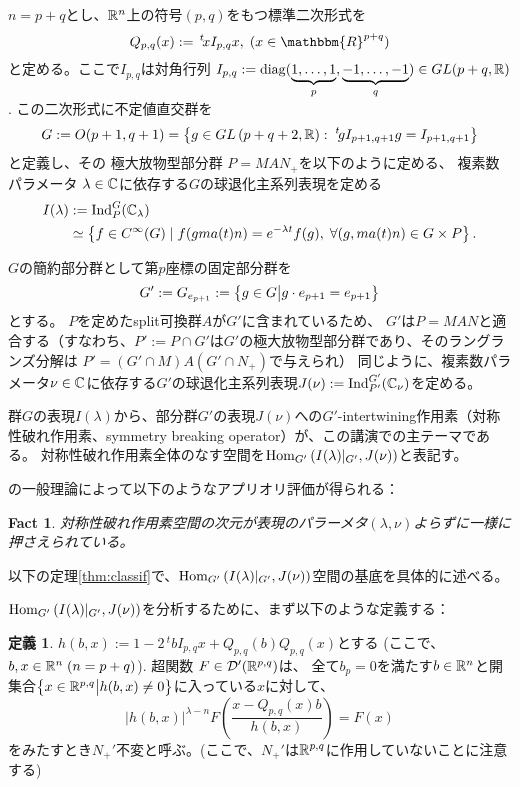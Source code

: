 \documentclass[12pt]{article} %
\newcommand{\assign}{:=}
\newcommand{\tmop}[1]{\ensuremath{\operatorname{#1}}}
\newcommand{\Hom}{\mbox{\normalfont Hom}}
\newcommand{\Ind}{\mbox{\normalfont Ind}}
\newtheorem{fact}{Fact}
\theoremstyle{definition}
\newtheorem{definition}{定義}
\theoremstyle{exampstyle} \newtheorem{examp}[theorem]{Theorem}
\renewcommand{\Q}{Q_{p,q}}
\newcommand{\IlambdaGprime}{I(\lambda)\kern-0.3em\mid_{G'}}
\newcommand{\SBO}{\Hom_{G'}\left(\IlambdaGprime,J(\nu) \right)}
\newcommand{\doubt}[1]{\uwave{#1}}
\begin{document}
  \begin{versiona}
	  $n=p+q$と{し}、$\mathbb{R}^n$上の符号$(p,q)$をもつ標準二次形式を
	  \begin{equation*}
  \Q (x) \assign \,^t \! x I_{p, q} x, \; (x \in
  \mathbbm{R}^{p + q})
	  \end{equation*}
	  と定める。ここで$I_{p,q}$は対角行列
   $I_{p, q} \assign \tmop{diag} (\underbrace{1, \ldots, 1}_p, \underbrace{-
  1, \ldots, - 1}_q)\in GL(p+q,\R)$.
この二次形式に\doubt{関する}不定値直交群を
\begin{equation*}
	G \assign O (p +
1, q + 1)=\left\{ g\in GL\left( p+q+2,\R \right):\;^t\!gI_{p+1,q+1}g=I_{p+1,q+1} \right\}
\end{equation*}
と定義し、その
極大放物型部分群
$P=MAN_{+}$を以下のように定める、
複素数パラメータ
$\lambda\in\mathbb{C}$に依存する$G$の球退化主系列表現を定める
\begin{align*}
I(\lambda)&:=\Ind_P^G(\C_\lambda)\\
&\simeq \left\{ f\in C^{\infty}(G)\mid f(gma(t)n)=e^{-\lambda t}f(g),\;\forall(g,ma(t)n)\in G\times P \right\}.
\end{align*}

$G$の簡約部分群として第$p$座標の固定部分群を
\begin{equation*}
	G':=G_{e_{p+1}}:=\left\{g \in G\big| g \cdot e_{p + 1} = e_{p + 1}\right\}
\end{equation*}
とする。
$P$を定めたsplit可換群$A$が$G'$に含まれているため、
$G'$は$P=MAN$と適合する（すなわち、$P':=P\cap G'$は$G'$の極大放物型部分群であり、そのラングランズ分解は
$P'=(G'\cap M)A(G'\cap N_+)$で与えられ\doubt{る}）
同じように、複素数パラメータ$\nu\in\mathbb{C}$に依存する$G'$の球退化主系列表現$J(\nu):=\Ind_{P'}^{G'}(\C_{\nu})$を定める。

群$G$の表現$I(\lambda)$から、部分群$G'$の表現$J(\nu)$への$G'$-intertwining作用素（対称性破れ作用素、symmetry breaking operator）が、この講演での主テーマである。
対称性破れ作用素全体のなす空間を$\SBO$と表記す\doubt{る}。

\cite{kobayashi2013finite,kobayashi2014classification}の一般理論によって以下のようなアプリオリ評価が得られる：
\begin{fact}
	対称性破れ作用素空間の次元が表現のパラーメタ$(\lambda,\nu)$よらずに一様に押さえられている。
\end{fact}
以下の定理\ref{thm:classif}で、$\SBO$空間の基底を具体的に述べる。

$\SBO$を分析するために、まず以下のような定義する：
\begin{definition} \label{def1}
	$h(b,x):=1-2\,^t\!bI_{p,q}x+\Q(b)\Q(x)$とする (ここで、$b,x\in\mathbb{R}^{n}\;(n=p+q)$). 超関数
	$F \in \mathcal{D}' (\mathbb{R}^{p,q})$は、
	全て$b_p=0$を満たす$b\in\mathbb{R}^n$と開集合$\left\{x\in\mathbb{R}^{p,q}\big| h(b,x)\neq0\right\}$に入っている$x$に対して、
  \begin{equation*}
    \label{eq-Nequiv} | h(b,x) |^{\lambda - n} F \left(
    \frac{x - \Q (x) b}{h(b,x)} \right) = F (x)
  \end{equation*}
  をみたすとき{$N_+'$不変}と呼ぶ。(ここで、$N_+'$は$\mathbb{R}^{p,q}$に作用していないことに注意する)
\end{definition}


\end{versiona}
\end{document}
